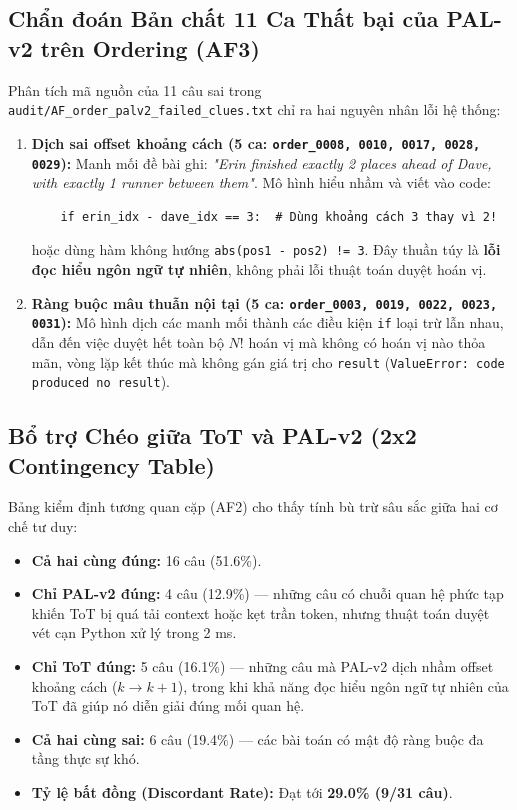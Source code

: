 \documentclass[11pt,a4paper]{report}
\begin{document}
\subsection{Chẩn đoán Bản chất 11 Ca Thất bại của PAL-v2 trên Ordering (AF3)}
Phân tích mã nguồn của 11 câu sai trong \texttt{audit/AF\_order\_palv2\_failed\_clues.txt} chỉ ra hai nguyên nhân lỗi hệ thống:
\begin{enumerate}[leftmargin=*]
    \item \textbf{Dịch sai offset khoảng cách (5 ca: \texttt{order\_0008, 0010, 0017, 0028, 0029}):}  
    Manh mối đề bài ghi: \textit{"Erin finished exactly 2 places ahead of Dave, with exactly 1 runner between them"}. Mô hình hiểu nhầm và viết vào code:
    \begin{verbatim}
    if erin_idx - dave_idx == 3:  # Dùng khoảng cách 3 thay vì 2!
    \end{verbatim}
    hoặc dùng hàm không hướng \texttt{abs(pos1 - pos2) != 3}. Đây thuần túy là \textbf{lỗi đọc hiểu ngôn ngữ tự nhiên}, không phải lỗi thuật toán duyệt hoán vị.
    \item \textbf{Ràng buộc mâu thuẫn nội tại (5 ca: \texttt{order\_0003, 0019, 0022, 0023, 0031}):}  
    Mô hình dịch các manh mối thành các điều kiện \texttt{if} loại trừ lẫn nhau, dẫn đến việc duyệt hết toàn bộ $N!$ hoán vị mà không có hoán vị nào thỏa mãn, vòng lặp kết thúc mà không gán giá trị cho \texttt{result} (\texttt{ValueError: code produced no result}).
\end{enumerate}

\subsection{Bổ trợ Chéo giữa ToT và PAL-v2 (2x2 Contingency Table)}
Bảng kiểm định tương quan cặp (AF2) cho thấy tính bù trừ sâu sắc giữa hai cơ chế tư duy:
\begin{itemize}[leftmargin=*]
    \item \textbf{Cả hai cùng đúng:} 16 câu (51.6\%).
    \item \textbf{Chỉ PAL-v2 đúng:} 4 câu (12.9\%) — những câu có chuỗi quan hệ phức tạp khiến ToT bị quá tải context hoặc kẹt trần token, nhưng thuật toán duyệt vét cạn Python xử lý trong 2 ms.
    \item \textbf{Chỉ ToT đúng:} 5 câu (16.1\%) — những câu mà PAL-v2 dịch nhầm offset khoảng cách ($k \to k+1$), trong khi khả năng đọc hiểu ngôn ngữ tự nhiên của ToT đã giúp nó diễn giải đúng mối quan hệ.
    \item \textbf{Cả hai cùng sai:} 6 câu (19.4\%) — các bài toán có mật độ ràng buộc đa tầng thực sự khó.
    \item \textbf{Tỷ lệ bất đồng (Discordant Rate):} Đạt tới \textbf{29.0\% (9/31 câu)}.
\end{itemize}
\end{document}
